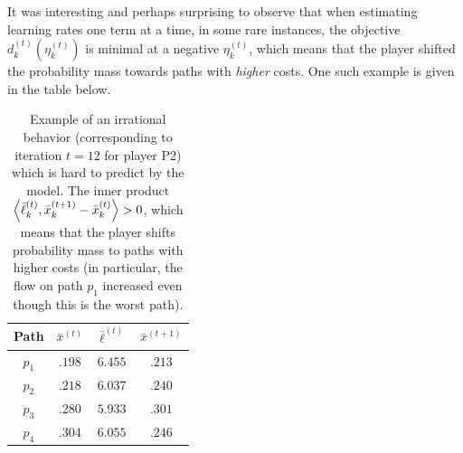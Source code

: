 \documentclass{sig-alternate-ipsn13}
\begin{document}
It was interesting and perhaps surprising to observe that when estimating learning rates one term at a time, in some rare instances, the objective $d^{(t)}_k(\eta_k^{(t)})$ is minimal at a negative $\eta_k^{(t)}$, which means that the player shifted the probability mass towards paths with \emph{higher} costs. One such example is given in the table below.
\begin{table}[h]
\centering
\small
\begin{tabular}{|c|c|c|c|}
\hline
Path & $\bar x^{(t)}$ & $\bar \ell^{(t)}$ & $\bar x^{(t+1)}$ \\
\hline
$p_1$ & $.198$ & $6.455$ & $.213$ \\
\hline
$p_2$ & $.218$ & $6.037$ & $.240$ \\
\hline
$p_3$ & $.280$ & $5.933$ & $.301$ \\
\hline
$p_4$ & $.304$ & $6.055$ & $.246$ \\
\hline
\end{tabular}
\caption{\footnotesize Example of an irrational behavior (corresponding to iteration $t = 12$ for player P2) which is hard to predict by the model. The inner product $\left\langle \bar \ell_k^{(t)}, \bar x^{(t+1)}_k - \bar x^{(t)}_k \right\rangle > 0$, which means that the player shifts probability mass to paths with higher costs (in particular, the flow on path $p_1$ increased even though this is the worst path).}
\end{table}
\end{document}
